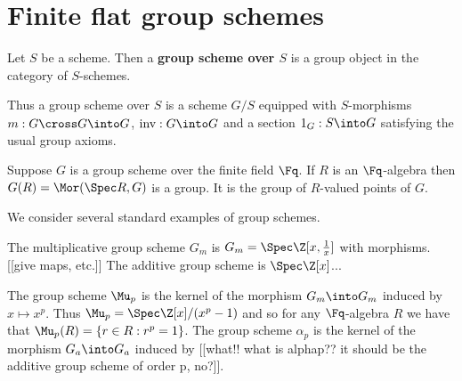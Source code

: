 \documentclass{report}
\begin{document}


\section{Finite flat group schemes}
\begin{defn}Let $S$ be a scheme. Then a
{\bfseries group scheme over $S$} is a group object
in the category of $S$-schemes.
\end{defn}
Thus a group scheme over $S$ is a scheme $G/S$ equipped
with $S$-morphisms $m:G\cross G\into G$, $\text{inv}:G\into G$
and a section $1_G:S\into G$ satisfying the usual group axioms.

Suppose $G$ is a group scheme over the finite field $\Fq$. If
$R$ is an $\Fq$-algebra then $G(R)=\Mor(\Spec R,G)$ is
a group. It is the group of $R$-valued points of $G$.

We consider several standard examples of group schemes.
\begin{example} The multiplicative group scheme $G_m$
is $G_m=\Spec\Z[x,\frac{1}{x}]$ with morphisms. [[give maps, etc.]]
The additive group scheme is $\Spec\Z[x]$...
\end{example}
\begin{example} The group scheme $\Mu_p$ is the kernel
of the morphism $G_m\into G_m$ induced by $x\mapsto x^p$.
Thus $\Mu_p=\Spec\Z[x]/(x^p-1)$ and so for any $\Fq$-algebra
$R$ we have that $\Mu_p(R)=\{r\in R : r^p=1\}$.
The group scheme $\alpha_p$ is the kernel of the morphism
$G_a\into G_a$ induced by [[what!! what is alphap?? it
should be the additive group scheme of order p, no?]].
\end{example}
\end{document}
